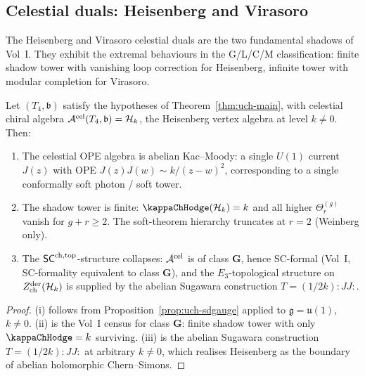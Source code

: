 \subsection{Celestial duals: Heisenberg and Virasoro}
\label{subsec:uch-duals}

The Heisenberg and Virasoro celestial duals are the two fundamental
shadows of Vol~I. They exhibit the extremal behaviours in the
G/L/C/M classification: finite shadow tower with vanishing loop correction
for Heisenberg, infinite tower with modular completion for Virasoro.

\begin{proposition}
\label{prop:uch-celestial-heisenberg}
Let $(T_4,\mathfrak b)$ satisfy the hypotheses of
Theorem~\ref{thm:uch-main}, with celestial chiral algebra
$\mathcal A^{\mathrm{cel}}(T_4,\mathfrak b) = \mathcal H_k$, the Heisenberg vertex
algebra at level $k \neq 0$. Then:
\begin{enumerate}[label=\textup{(\roman*)}]
\item The celestial OPE algebra is abelian Kac--Moody: a single
$U(1)$ current $J(z)$ with OPE $J(z)J(w) \sim k/(z-w)^2$,
corresponding to a single conformally soft photon / soft tower.
\item The shadow tower is finite: $\kap(\cH_k) = k$ and all higher
$\Theta^{(g)}_r$ vanish for $g + r \geq 2$. The soft-theorem
hierarchy truncates at $r = 2$ (Weinberg only).
\item The $\mathsf{SC}^{\mathrm{ch,top}}$-structure collapses: $\mathcal A^{\mathrm{cel}}$ is of
class $\mathbf G$, hence SC-formal (Vol~I, SC-formality equivalent
to class $\mathbf G$), and the $E_3$-topological structure on
$Z^{\mathrm{der}}_{\mathrm{ch}}(\mathcal H_k)$ is supplied by the abelian
Sugawara construction $T = (1/2k)\!:\!JJ\!:$.
\end{enumerate}
\end{proposition}

\begin{proof}
(i) follows from Proposition~\ref{prop:uch-sdgauge} applied to
$\mathfrak g = \mathfrak{u}(1)$, $k \neq 0$. (ii) is the Vol~I
census for class $\mathbf G$: finite shadow tower with only
$\kap = k$ surviving. (iii) is the abelian Sugawara construction
$T = (1/2k)\!:\!JJ\!:$ at arbitrary $k \neq 0$, which realises
Heisenberg as the boundary of abelian holomorphic Chern--Simons.
\end{proof}

